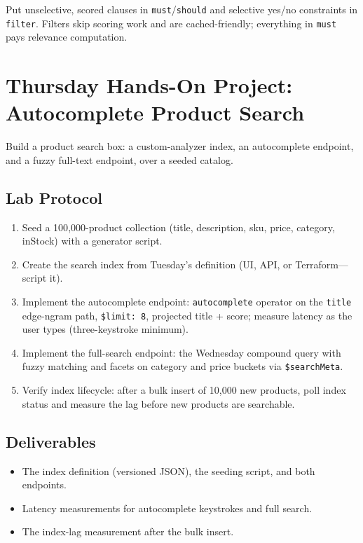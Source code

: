 \begin{tipbox}
Put unselective, scored clauses in \texttt{must}/\texttt{should} and selective yes/no constraints in \texttt{filter}. Filters skip scoring work and are cached-friendly; everything in \texttt{must} pays relevance computation.
\end{tipbox}

\section{Thursday Hands-On Project: Autocomplete Product Search}
Build a product search box: a custom-analyzer index, an autocomplete endpoint, and a fuzzy full-text endpoint, over a seeded catalog.

\subsection{Lab Protocol}
\begin{enumerate}
    \item Seed a 100{,}000-product collection (title, description, sku, price, category, inStock) with a generator script.
    \item Create the search index from Tuesday's definition (UI, API, or Terraform---script it).
    \item Implement the autocomplete endpoint: \texttt{autocomplete} operator on the \texttt{title} edge-ngram path, \texttt{\$limit: 8}, projected title + score; measure latency as the user types (three-keystroke minimum).
    \item Implement the full-search endpoint: the Wednesday compound query with fuzzy matching and facets on category and price buckets via \texttt{\$searchMeta}.
    \item Verify index lifecycle: after a bulk insert of 10{,}000 new products, poll index status and measure the lag before new products are searchable.
\end{enumerate}

\subsection*{Deliverables}
\begin{itemize}
    \item The index definition (versioned JSON), the seeding script, and both endpoints.
    \item Latency measurements for autocomplete keystrokes and full search.
    \item The index-lag measurement after the bulk insert.
\end{itemize}

